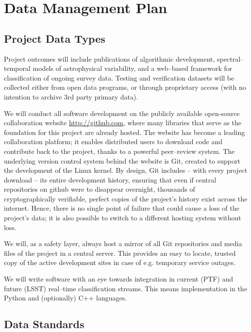 \documentclass[11pt]{article}
\begin{document}
\section*{\label{sec:Data-Management-Plan}Data Management Plan}

\setcounter{page}{1}


\subsection*{Project Data Types}

Project outcomes will include publications of algorithmic development,
spectral--temporal models of astrophysical variability, and a web--based
framework for classification of ongoing survey data.  Testing and verification
datasets will be collected either from open data programs, or through
proprietary access (with no intention to archive 3rd party primary data).

We will conduct all software development on the publicly available open-source
collaboration website {\url{http://github.com}}, where many libraries that serve
as the foundation for this project are already hosted.  The website has become a
leading collaboration platform; it enables distributed users to download code
and contribute back to the project, thanks to a powerful peer--review system.
The underlying version control system behind the website is Git, created to
support the development of the Linux kernel. By design, Git includes -- with
every project download -- its entire development history, ensuring that even if
central repositories on github were to disappear overnight, thousands of
cryptographically verifiable, perfect copies of the project's history exist
across the internet. Hence, there is no single point of failure that could cause
a loss of the project's data; it is also possible to switch to a different
hosting system without loss.

We will, as a safety layer, always host a mirror of all Git repositories and
media files of the project in a central server.  This provides an easy to
locate, trusted copy of the active development sites in case of e.g. temporary
service outages.

We will write software with an eye towards integration in current (PTF) and
future (LSST) real--time classification streams.  This means implementation in
the Python and (optionally) C++ languages.

\subsection*{Data Standards}
\end{document}
